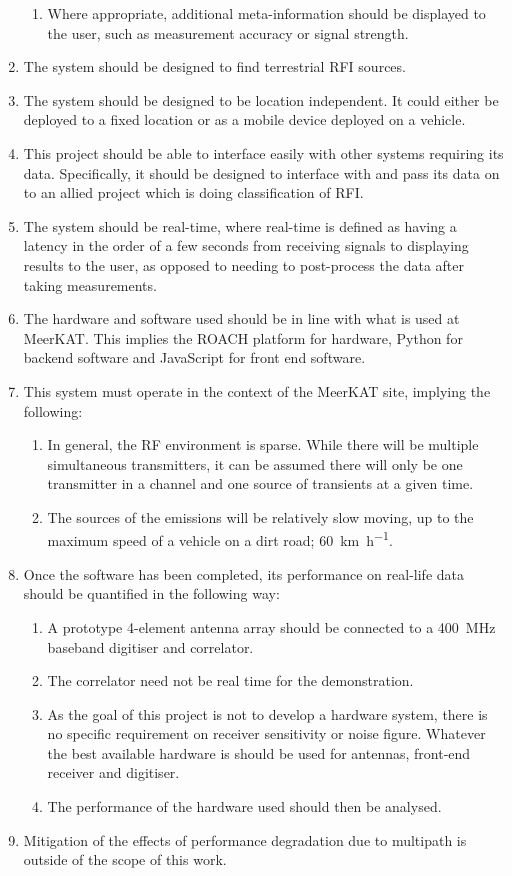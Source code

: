 \begin{enumerate}
\begin{enumerate}
      \item Where appropriate, additional meta-information should be displayed to the user, such as measurement accuracy or signal strength.
    \end{enumerate}
  \item The system should be designed to find terrestrial RFI sources.
  \item The system should be designed to be location independent. It could either be deployed to a fixed location or as a mobile device deployed on a vehicle.
  \item This project should be able to interface easily with other systems requiring its data. Specifically, it should be designed to interface with and pass its data on to an allied project which is doing classification of RFI.
  \item The system should be real-time, where real-time is defined as having a latency in the order of a few seconds from receiving signals to displaying results to the user, as opposed to needing to post-process the data after taking measurements.
  \item The hardware and software used should be in line with what is used at MeerKAT. This implies the ROACH platform for hardware, Python for backend software and JavaScript for front end software.  
  \item This system must operate in the context of the MeerKAT site, implying the following:
  \begin{enumerate}
      \item In general, the RF environment is sparse. While there will be multiple simultaneous transmitters, it can be assumed there will only be one transmitter in a channel and one source of transients at a given time.
      \item The sources of the emissions will be relatively slow moving, up to the maximum speed of a vehicle on a dirt road; \SI[per-mode=symbol]{60}{\kilo\metre\per\hour}.
  \end{enumerate}

  \item Once the software has been completed, its performance on real-life data should be quantified in the following way:
    \begin{enumerate}
      \item A prototype 4-element antenna array should be connected to a \SI{400}{\mega\hertz} baseband digitiser and correlator.
      \item The correlator need not be real time for the demonstration.
      \item As the goal of this project is not to develop a hardware system, there is no specific requirement on receiver sensitivity or noise figure. Whatever the best available hardware is should be used for antennas, front-end receiver and digitiser. 
      \item The performance of the hardware used should then be analysed. 
    \end{enumerate}
  \item Mitigation of the effects of performance degradation due to multipath is outside of the scope of this work.


\end{enumerate}
